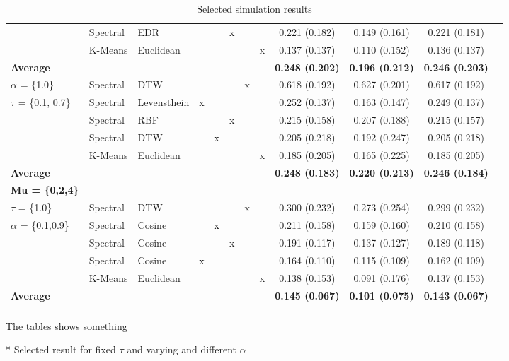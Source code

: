 \documentclass[12pt,a4paper,bibliography=totocnumbered,listof=totocnumbered]{scrartcl}
\begin{document}
\begin{table}[!htbp]
{\begin{tabular}{@{\extracolsep{0pt}} lllccccccccc}
			& Spectral & EDR &  &  & x &  &  & 0.221 (0.182) & 0.149 (0.161) & 0.221 (0.181) \\ 
			& K-Means & Euclidean &  &  &  &  & x & 0.137 (0.137) & 0.110 (0.152) & 0.136 (0.137) \\ 
			\hline
			\textbf{Average}  &  &  &  &  &  &  &  &  \textbf{0.248 (0.202)} &  \textbf{0.196 (0.212)} &  \textbf{0.246 (0.203)} \\ 
			\hline
			$\alpha$ = \{1.0\} & Spectral & DTW &  &  &  & x &  & 0.618 (0.192) & 0.627 (0.201) & 0.617 (0.192) \\ 
			$\tau$ = \{0.1, 0.7\} & Spectral & Levensthein & x &  &  &  &  & 0.252 (0.137) & 0.163 (0.147) & 0.249 (0.137) \\ 
			& Spectral & RBF &  &  & x &  &  & 0.215 (0.158) & 0.207 (0.188) & 0.215 (0.157) \\ 
			& Spectral & DTW &  & x &  &  &  & 0.205 (0.218) & 0.192 (0.247) & 0.205 (0.218) \\ 
			& K-Means & Euclidean &  &  &  &  & x & 0.185 (0.205) & 0.165 (0.225) & 0.185 (0.205) \\ 
			\hline
			\textbf{Average} &  &  &  &  &  &  &  &  \textbf{0.248 (0.183)} &  \textbf{0.220 (0.213)} &  \textbf{0.246 (0.184)} \\ 
			\hline
			\textbf{Mu = \{0,2,4\}}\tnote{*} &  &  &  &  &  &  &  &  &  &  \\ 
			\hline
			$\tau$ = \{1.0\}  & Spectral & DTW &  &  &  & x &  & 0.300 (0.232) & 0.273 (0.254) & 0.299 (0.232) \\ 
			$\alpha$ = \{0.1,0.9\} & Spectral & Cosine &  & x &  &  &  & 0.211 (0.158) & 0.159 (0.160) & 0.210 (0.158) \\ 
			& Spectral & Cosine &  &  & x &  &  & 0.191 (0.117) & 0.137 (0.127) & 0.189 (0.118) \\ 
			& Spectral & Cosine & x &  &  &  &  & 0.164 (0.110) & 0.115 (0.109) & 0.162 (0.109) \\ 
			& K-Means & Euclidean &  &  &  &  & x & 0.138 (0.153) & 0.091 (0.176) & 0.137 (0.153) \\ 
			\hline
			\textbf{Average}  &  &  &  &  &  &  &  &  \textbf{0.145 (0.067)} &  \textbf{0.101 (0.075)} &  \textbf{0.143 (0.067)} \\ 
			\hline \\[-1.8ex] 
		\end{tabular}}
		\begin{tcolorbox}[arc=0mm,title=Notes,boxrule=0.2mm,colbacktitle=white,coltitle=black,colback=white,top=0mm,bottom=0.1mm]
			\begin{tablenotes}
				\item The tables shows something
				\item[*] Selected result for fixed $\tau$ and varying and different $\alpha$
			\end{tablenotes}
		\end{tcolorbox}
		\caption{Selected simulation results}
		\label{tab:simres} 
	\end{table}
\end{document}
